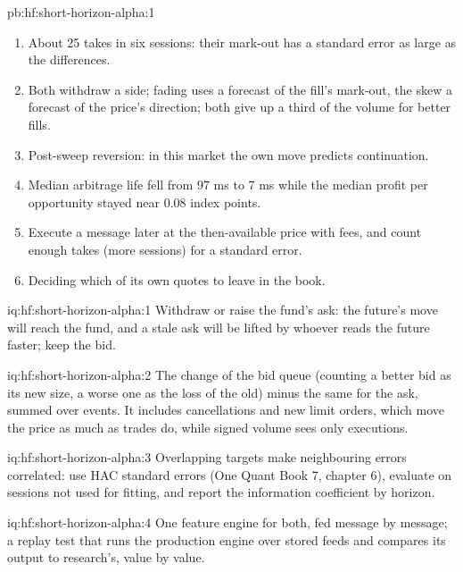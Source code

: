 \begin{solution}{pb:hf:short-horizon-alpha:1}
\begin{enumerate}
coefficient falls by less than 1\% (0.480 to 0.477).
\item About 25 takes in six sessions: their mark-out has a standard error as large as the differences.
\item Both withdraw a side; fading uses a forecast of the fill's mark-out, the skew a forecast of the price's direction; both give up a third of the
volume for better fills.
\item Post-sweep reversion: in this market the own move predicts continuation.
\item Median arbitrage life fell from 97 ms to 7 ms while the median profit per opportunity stayed near 0.08 index points.
\item Execute a message later at the then-available price with fees, and count enough takes (more sessions) for a standard error.
\item Deciding which of its own quotes to leave in the book.
\end{enumerate}
\end{solution}

\begin{solution}{iq:hf:short-horizon-alpha:1}
Withdraw or raise the fund's ask: the future's move will reach the fund, and a stale ask will be lifted by whoever reads the future faster; keep the
bid.
\end{solution}

\begin{solution}{iq:hf:short-horizon-alpha:2}
The change of the bid queue (counting a better bid as its new size, a worse one as the loss of the old) minus the same for the ask, summed over
events. It includes cancellations and new limit orders, which move the price as much as trades do, while signed volume sees only executions.
\end{solution}

\begin{solution}{iq:hf:short-horizon-alpha:3}
Overlapping targets make neighbouring errors correlated: use HAC standard errors (One Quant Book 7, chapter 6), evaluate on sessions not used for
fitting, and report the information coefficient by horizon.
\end{solution}

\begin{solution}{iq:hf:short-horizon-alpha:4}
One feature engine for both, fed message by message; a replay test that runs the production engine over stored feeds and compares its output to
research's, value by value.
\end{solution}

